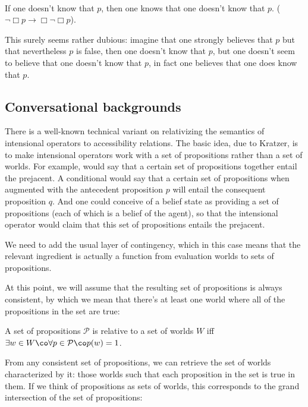 \ex {}\\
If one doesn't know that $p$, then one knows that one doesn't know that $p$.
($\neg\Box p \rightarrow \Box\neg\Box p$). \xe

This surely seems rather dubious: imagine that one strongly believes that $p$
but that nevertheless $p$ is false, then one doesn't know that $p$, but one
doesn't seem to believe that one doesn't know that $p$, in fact one believes
that one does know that $p$.

\clearpage
\subsection{Conversational backgrounds}
\label{sec:conversational-backgrounds}

%
There is a well-known technical variant on relativizing the semantics of
intensional operators to accessibility relations. The basic idea, due to
Kratzer, is to make intensional operators work with a set of propositions rather
than a set of worlds. For example,  would say that a certain
set of propositions together entail the prejacent. A conditional  would say that a certain set of propositions when augmented with
the antecedent proposition $p$ will entail the consequent proposition $q$.
And one could conceive of a belief state as providing a set of propositions
(each of which is a belief of the agent), so that the intensional operator
 would claim that this set of propositions entails the
prejacent.

We need to add the usual layer of contingency, which in this case means that the
relevant ingredient is actually a function from evaluation worlds to sets of
propositions.

At this point, we will assume that the resulting set of propositions is always
consistent, by which we mean that there's at least one world where all of the
propositions in the set are true:

\ex A set of propositions $\mathcal{P}$ is  relative to a set
of worlds $W$ iff $\exists w\in W\co \forall p\in\mathcal{P}\co p(w)=1$. \xe

From any consistent set of propositions, we can retrieve the set of worlds
characterized by it: those worlds such that each proposition in the set is true
in them. If we think of propositions as sets of worlds, this corresponds to the
grand intersection of the set of propositions:

